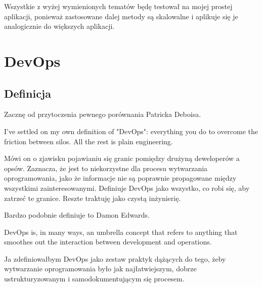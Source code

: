 \documentclass{article}
\begin{document}
Wszystkie z wyżej wymienionych tematów będę testował na mojej prostej aplikacji, ponieważ zastosowane dalej metody są skalowalne i aplikuje się je analogicznie do większych aplikacji.


\section {DevOps}
\subsection{Definicja}

Zacznę od przytoczenia pewnego porównania Patricka Deboisa\cite{devOpsHandbook}.

\begin{displayquote}
    I've settled on my own definition of "DevOps": everything you do to overcome the friction between silos. All the rest is plain engineering.
\end{displayquote}

Mówi on o zjawisku pojawianiu się granic pomiędzy drużyną deweloperów a opsów. Zaznacza, że jest to niekorzystne dla procesu wytwarzania oprogramowania, jako że informacje nie są poprawnie propagowane między wszystkimi zainteresowanymi. Definiuje DevOps jako wszystko, co robi się, aby zatrzeć te granice. Reszte traktuję jako czystą inżynierię.
\newline

Bardzo podobnie definiuje to Damon Edwards\cite{damonEdwards}.

\begin{displayquote}
    DevOps is, in many ways, an umbrella concept that refers to anything that smoothes out the interaction between development and operations.
\end{displayquote}

Ja zdefiniowałbym DevOps jako zestaw praktyk dążących do tego, żeby wytwarzanie oprogramowania było jak najłatwiejszym, dobrze ustrukturyzowanym i samodokumentującym się procesem.
\end{document}
